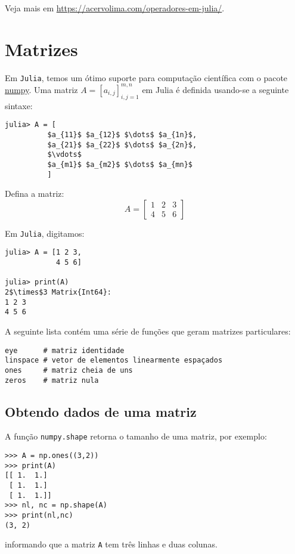 Veja mais em \url{https://acervolima.com/operadores-em-julia/}.

\section{Matrizes}

Em \verb+Julia+, temos um ótimo suporte para computação científica com o pacote \href{http://www.numpy.org/}{numpy}. Uma matriz $A = [a_{i,j}]_{i,j=1}^{m,n}$ em Julia é definida usando-se a seguinte sintaxe:
\begin{lstlisting}[mathescape=true]
julia> A = [
          $a_{11}$ $a_{12}$ $\dots$ $a_{1n}$,
          $a_{21}$ $a_{22}$ $\dots$ $a_{2n}$,
          $\vdots$
          $a_{m1}$ $a_{m2}$ $\dots$ $a_{mn}$
          ]
\end{lstlisting}

\begin{ex}
  Defina a matriz:
  \begin{equation}
    A = \left[
      \begin{array}{ccc}
        1 & 2 & 3\\
        4 & 5 & 6
      \end{array}
\right]
  \end{equation}
\end{ex}
\begin{sol}
  Em \verb+Julia+, digitamos:
\begin{lstlisting}[mathescape=true]
julia> A = [1 2 3,
            4 5 6]

julia> print(A)
2$\times$3 Matrix{Int64}:
1 2 3
4 5 6
\end{lstlisting}
\end{sol}

A seguinte lista contém uma série de funções que geram matrizes particulares:

\begin{lstlisting}
eye      # matriz identidade
linspace # vetor de elementos linearmente espaçados
ones     # matriz cheia de uns
zeros    # matriz nula
\end{lstlisting}

\subsection{Obtendo dados de uma matriz}

A função \verb+numpy.shape+ retorna o tamanho de uma matriz, por exemplo:
\begin{lstlisting}
>>> A = np.ones((3,2))
>>> print(A)
[[ 1.  1.]
 [ 1.  1.]
 [ 1.  1.]]
>>> nl, nc = np.shape(A)
>>> print(nl,nc)
(3, 2)
\end{lstlisting}
informando que a matriz \verb+A+ tem três linhas e duas colunas.

